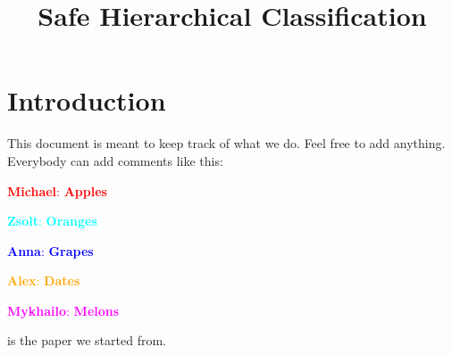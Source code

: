 \documentclass[runningheads]{llncs}
\newcommand{\michael}[1]{\textcolor{red}{{\textbf{Michael}: \textbf{#1}}}}
\newcommand{\zsolt}[1]{\textcolor{cyan}{{\textbf{Zsolt}: \textbf{#1}}}}
\newcommand{\anna}[1]{\textcolor{blue}{{\textbf{Anna}: \textbf{#1}}}}
\newcommand{\alex}[1]{\textcolor{orange}{{\textbf{Alex}: \textbf{#1}}}}
\newcommand{\mykhailo}[1]{\textcolor{magenta}{{\textbf{Mykhailo}: \textbf{#1}}}}
\begin{document}
\title{Safe Hierarchical Classification}

\maketitle

\section{Introduction}

This document is meant to keep track of what we do. Feel free to add anything. Everybody can add comments like this:

\michael{Apples}

\zsolt{Oranges}

\anna{Grapes}

\alex{Dates}

\mykhailo{Melons}

\cite{eleonora_hierarchical} is the paper we started from.



\end{document}
